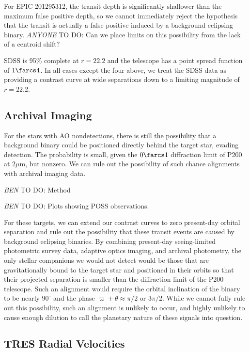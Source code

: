 \documentclass{emulateapj}
\newcommand{\todo}[3]{{\color{#2} \emph{#1} TO DO: #3}}
\newcommand{\btmtodo}[1]{\todo{BEN}{red}{#1}}
\newcommand{\anytodo}[1]{\todo{ANYONE}{NavyBlue}{#1}}
\begin{document}
For EPIC 201295312, the transit depth is significantly shallower than
the maximum false positive depth, so we cannot immediately
reject the hypothesis that the transit is actually a false positive
induced by a background eclipsing binary. \anytodo{Can we place limits
on this possibility from the lack of a centroid shift?}

SDSS is 95\% complete at $r=22.2$ and the telescope has a point
spread function of $1\farcs4$. In all cases except the four above, we
treat the SDSS data as providing a contrast curve at wide separations
down to a limiting magnitude of $r=22.2$.

\subsection{Archival Imaging}

For the stars with AO nondetections, there is still the
possibility that a background binary could be positioned
directly behind the target star, evading detection.
The probability is small, given the $0\farcs1$ diffraction limit
of P200 at $2\mu$m, but nonzero.
We can rule out the possibility of such chance alignments with
archival imaging data.

\btmtodo{Method}

\btmtodo{Plots showing POSS observations.}

For these targets, we can extend our contrast curves to zero
present-day orbital separation and rule out the possibility that
these transit events are caused by background eclipsing binaries.
By combining present-day seeing-limited photometric survey data,
adaptive optics imaging, and archival photometry, the only stellar companions
we would not detect would be those that are gravitationally bound to the target
star and positioned in their orbits so that their projected separation is
smaller than the diffraction limit of the P200 telescope.
Such an alignment would require the orbital inclination of the binary to be
nearly $90^\circ$ and the phase $\varpi + \theta \approx \pi/2$ or $3\pi/2$.
While we cannot fully rule out this possibility, such an alignment is unlikely
to occur, and highly unlikely to cause enough dilution to call the planetary
nature of these signals into question.




\subsection{TRES Radial Velocities}
\end{document}
